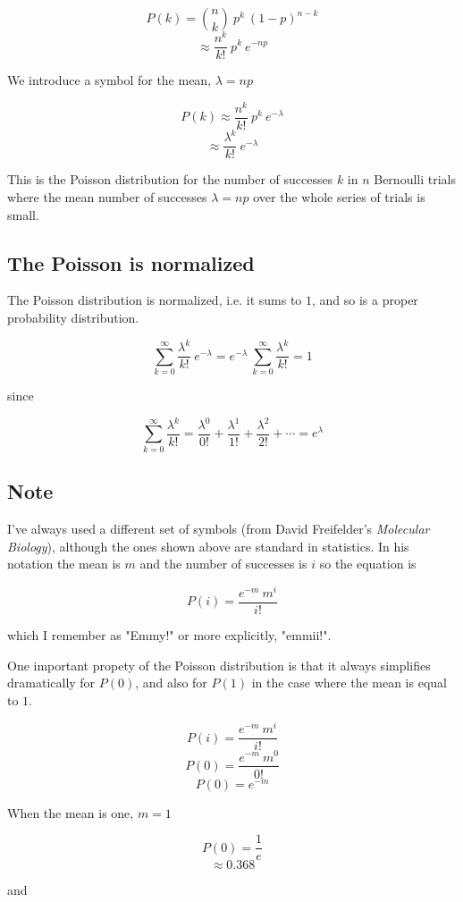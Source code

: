 \documentclass[11pt, oneside]{article}
\begin{document}
\[ P(k) = {n\choose k} \  p^k \  (1-p)^{n-k} \]
\[ \approx \frac{n^k}{k!} \ p^k \ e^{-np} \]

We introduce a symbol for the mean, $\lambda = np$

\[ P(k) \approx \frac{n^k}{k!} \ p^k \ e^{-\lambda} \]
\[ \approx  \frac{\lambda^k}{k!} \ e^{-\lambda} \]

This is the Poisson distribution for the number of successes $k$ in $n$ Bernoulli trials where the mean number of successes $\lambda = np$ over the whole series of trials is small.

\subsection*{The Poisson is normalized}

The Poisson distribution is normalized, i.e. it sums to $1$, and so is a proper probability distribution.

\[ \sum\limits_{k=0}^{\infty} \frac{\lambda^k}{k!} \ e^{-\lambda} = e^{-\lambda} \ \sum\limits_{k=0}^{\infty} \frac{\lambda^k}{k!} = 1 \]

since

\[ \sum\limits_{k=0}^{\infty} \frac{{\lambda}^k}{k!} = \frac{{\lambda}^0}{0!} + \frac{{\lambda}^1}{1!} + \frac{{\lambda}^2}{2!} + \cdots  = e^{\lambda} \]


\subsection*{Note}

I've always used a different set of symbols (from David Freifelder's \emph{Molecular Biology}), although the ones shown above are standard in statistics.  In his notation the mean is $m$ and the number of successes is $i$ so the equation is

\[ P(i) = \frac{e^{-m} \ m^i }{ i! } \]

which I remember as "Emmy!" or more explicitly, "emmii!".

One important propety of the Poisson distribution is that it always simplifies dramatically for $P(0)$, and also for $P(1)$ in the case where the mean is equal to $1$.

\[ P(i) = \frac{e^{-m} \ m^i }{ i! } \]
\[ P(0) = \frac{e^{-m} \ m^0 }{ 0! } \]
\[ P(0) = e^{-m} \]

When the mean is one, $m = 1$

\[ P(0) = \frac{1}{e} \]
\[ \approx 0.368 \]

and 
\end{document}
